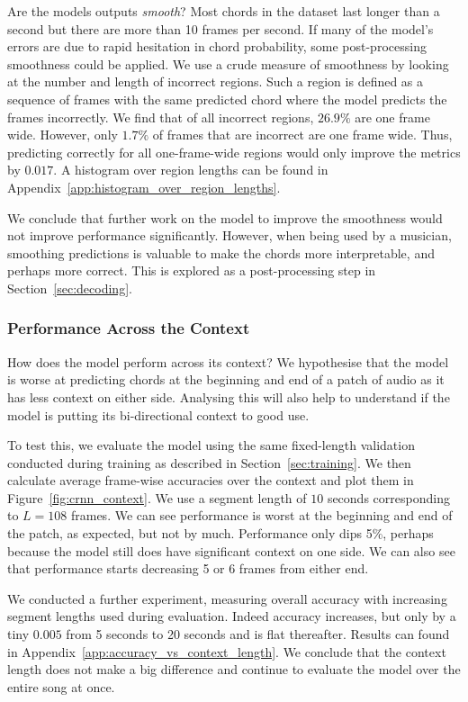 Are the models outputs \emph{smooth}? Most chords in the dataset last longer than a second but there are more than 10 frames per second. If many of the model's errors are due to rapid hesitation in chord probability, some post-processing smoothness could be applied. We use a crude measure of smoothness by looking at the number and length of incorrect regions. Such a region is defined as a sequence of frames with the same predicted chord where the model predicts the frames incorrectly. We find that of all incorrect regions, $26.9\%$ are one frame wide. However, only $1.7\%$ of frames that are incorrect are one frame wide. Thus, predicting correctly for all one-frame-wide regions would only improve the metrics by $0.017$. A histogram over region lengths can be found in Appendix~\ref{app:histogram_over_region_lengths}.

We conclude that further work on the model to improve the smoothness would not improve performance significantly. However, when being used by a musician, smoothing predictions is valuable to make the chords more interpretable, and perhaps more correct. This is explored as a post-processing step in Section~\ref{sec:decoding}.

\subsubsection{Performance Across the Context}\label{sec:crnn_performance_across_context}

How does the model perform across its context? We hypothesise that the model is worse at predicting chords at the beginning and end of a patch of audio as it has less context on either side. Analysing this will also help to understand if the model is putting its bi-directional context to good use.

To test this, we evaluate the model using the same fixed-length validation conducted during training as described in Section~\ref{sec:training}. We then calculate average frame-wise accuracies over the context and plot them in Figure~\ref{fig:crnn_context}. We use a segment length of $10$ seconds corresponding to $L=108$ frames. We can see performance is worst at the beginning and end of the patch, as expected, but not by much. Performance only dips 5\%, perhaps because the model still does have significant context on one side. We can also see that performance starts decreasing 5 or 6 frames from either end.

We conducted a further experiment, measuring overall accuracy with increasing segment lengths used during evaluation. Indeed accuracy increases, but only by a tiny $0.005$ from 5 seconds to 20 seconds and is flat thereafter. Results can found in Appendix~\ref{app:accuracy_vs_context_length}. We conclude that the context length does not make a big difference and continue to evaluate the model over the entire song at once.

